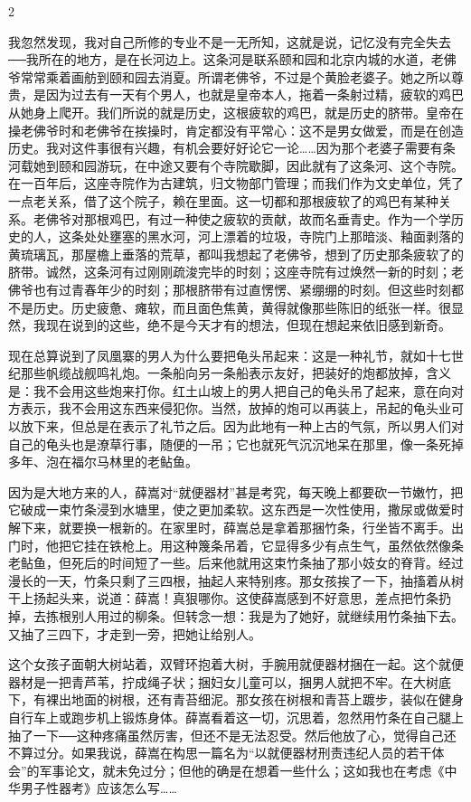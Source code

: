 2 

我忽然发现，我对自己所修的专业不是一无所知，这就是说，记忆没有完全失去──我所在的地方，是在长河边上。这条河是联系颐和园和北京内城的水道，老佛爷常常乘着画舫到颐和园去消夏。所谓老佛爷，不过是个黄脸老婆子。她之所以尊贵，是因为过去有一天有个男人，也就是皇帝本人，拖着一条射过精，疲软的鸡巴从她身上爬开。我们所说的就是历史，这根疲软的鸡巴，就是历史的脐带。皇帝在操老佛爷时和老佛爷在挨操时，肯定都没有平常心：这不是男女做爱，而是在创造历史。我对这件事很有兴趣，有机会要好好论它一论……因为那个老婆子需要有条河载她到颐和园游玩，在中途又要有个寺院歇脚，因此就有了这条河、这个寺院。在一百年后，这座寺院作为古建筑，归文物部门管理；而我们作为文史单位，凭了一点老关系，借了这个院子，赖在里面。这一切都和那根疲软了的鸡巴有某种关系。老佛爷对那根鸡巴，有过一种使之疲软的贡献，故而名垂青史。作为一个学历史的人，这条处处壅塞的黑水河，河上漂着的垃圾，寺院门上那暗淡、釉面剥落的黄琉璃瓦，那屋檐上垂落的荒草，都叫我想起了老佛爷，想到了历史那条疲软了的脐带。诚然，这条河有过刚刚疏浚完毕的时刻；这座寺院有过焕然一新的时刻；老佛爷也有过青春年少的时刻；那根脐带有过直愣愣、紧绷绷的时刻。但这些时刻都不是历史。历史疲惫、瘫软，而且面色焦黄，黄得就像那些陈旧的纸张一样。很显然，我现在说到的这些，绝不是今天才有的想法，但现在想起来依旧感到新奇。 

现在总算说到了凤凰寨的男人为什么要把龟头吊起来：这是一种礼节，就如十七世纪那些帆缆战舰鸣礼炮。一条船向另一条船表示友好，把装好的炮都放掉，含义是：我不会用这些炮来打你。红土山坡上的男人把自己的龟头吊了起来，意在向对方表示，我不会用这东西来侵犯你。当然，放掉的炮可以再装上，吊起的龟头业可以放下来，但总是在表示了礼节之后。因为此地有一种上古的气氛，所以男人们对自己的龟头也是潦草行事，随便的一吊；它也就死气沉沉地呆在那里，像一条死掉多年、泡在福尔马林里的老鲇鱼。 

因为是大地方来的人，薛嵩对“就便器材”甚是考究，每天晚上都要砍一节嫩竹，把它破成一束竹条浸到水塘里，使之更加柔软。这东西是一次性使用，撒尿或做爱时解下来，就要换一根新的。在家里时，薛嵩总是拿着那捆竹条，行坐皆不离手。出门时，他把它挂在铁枪上。用这种篾条吊着，它显得多少有点生气，虽然依然像条老鲇鱼，但死后的时间短了一些。后来他就用这束竹条抽了那小妓女的脊背。经过漫长的一天，竹条只剩了三四根，抽起人来特别疼。那女孩挨了一下，抽搐着从树干上扬起头来，说道：薛嵩！真狠哪你。这使薛嵩感到不好意思，差点把竹条扔掉，去拣根别人用过的柳条。但转念一想：我是为了她好，就继续用竹条抽下去。又抽了三四下，才走到一旁，把她让给别人。 

这个女孩子面朝大树站着，双臂环抱着大树，手腕用就便器材捆在一起。这个就便器材是一把青芦苇，拧成绳子状；捆妇女儿童可以，捆男人就把不牢。在大树底下，有裸出地面的树根，还有青苔细泥。那女孩在树根和青苔上踱步，装似在健身自行车上或跑步机上锻炼身体。薛嵩看着这一切，沉思着，忽然用竹条在自己腿上抽了一下──这种疼痛虽然厉害，但还不是无法忍受。然后他放了心，觉得自己还不算过分。如果我说，薛嵩在构思一篇名为“以就便器材刑责违纪人员的若干体会”的军事论文，就未免过分；但他的确是在想着一些什么；这如我也在考虑《中华男子性器考》应该怎么写…… 


